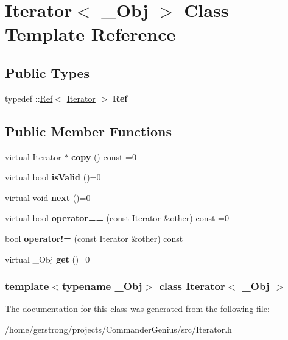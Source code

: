 \hypertarget{class_iterator}{
\section{Iterator$<$ \_\-Obj $>$ Class Template Reference}
\label{class_iterator}
}
\subsection*{Public Types}
\begin{DoxyCompactItemize}
\item 
\hypertarget{class_iterator_a3a856ed4ef3bbc1d0c38cc7a56cec926}{
typedef ::\hyperlink{class_ref}{Ref}$<$ \hyperlink{class_iterator}{Iterator} $>$ {\bfseries Ref}}
\label{class_iterator_a3a856ed4ef3bbc1d0c38cc7a56cec926}

\end{DoxyCompactItemize}
\subsection*{Public Member Functions}
\begin{DoxyCompactItemize}
\item 
\hypertarget{class_iterator_ab8d76adc7e12c0f6d959b00358aa7639}{
virtual \hyperlink{class_iterator}{Iterator} $\ast$ {\bfseries copy} () const =0}
\label{class_iterator_ab8d76adc7e12c0f6d959b00358aa7639}

\item 
\hypertarget{class_iterator_a0f40a2fe133374d6f2354d4be8109f55}{
virtual bool {\bfseries isValid} ()=0}
\label{class_iterator_a0f40a2fe133374d6f2354d4be8109f55}

\item 
\hypertarget{class_iterator_a3e186b919d8513cc3b36aa53021815f1}{
virtual void {\bfseries next} ()=0}
\label{class_iterator_a3e186b919d8513cc3b36aa53021815f1}

\item 
\hypertarget{class_iterator_a1520617bee11e2268bbe93d694e0572e}{
virtual bool {\bfseries operator==} (const \hyperlink{class_iterator}{Iterator} \&other) const =0}
\label{class_iterator_a1520617bee11e2268bbe93d694e0572e}

\item 
\hypertarget{class_iterator_a8036990e0d603c0017ecbe31efe4fb1a}{
bool {\bfseries operator!=} (const \hyperlink{class_iterator}{Iterator} \&other) const }
\label{class_iterator_a8036990e0d603c0017ecbe31efe4fb1a}

\item 
\hypertarget{class_iterator_a5417b5562745229401691ddeae327d55}{
virtual \_\-Obj {\bfseries get} ()=0}
\label{class_iterator_a5417b5562745229401691ddeae327d55}

\end{DoxyCompactItemize}
\subsubsection*{template$<$typename \_\-Obj$>$ class Iterator$<$ \_\-Obj $>$}



The documentation for this class was generated from the following file:\begin{DoxyCompactItemize}
\item 
/home/gerstrong/projects/CommanderGenius/src/Iterator.h\end{DoxyCompactItemize}
